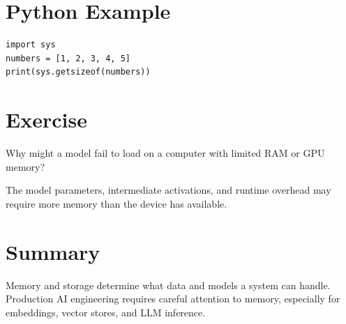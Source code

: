 \section{Python Example}
\begin{lstlisting}
import sys
numbers = [1, 2, 3, 4, 5]
print(sys.getsizeof(numbers))
\end{lstlisting}

\section{Exercise}
\begin{exercise}Why might a model fail to load on a computer with limited RAM or GPU memory?\end{exercise}
\begin{solution}The model parameters, intermediate activations, and runtime overhead may require more memory than the device has available.\end{solution}

\section{Summary}
Memory and storage determine what data and models a system can handle. Production AI engineering requires careful attention to memory, especially for embeddings, vector stores, and LLM inference.
